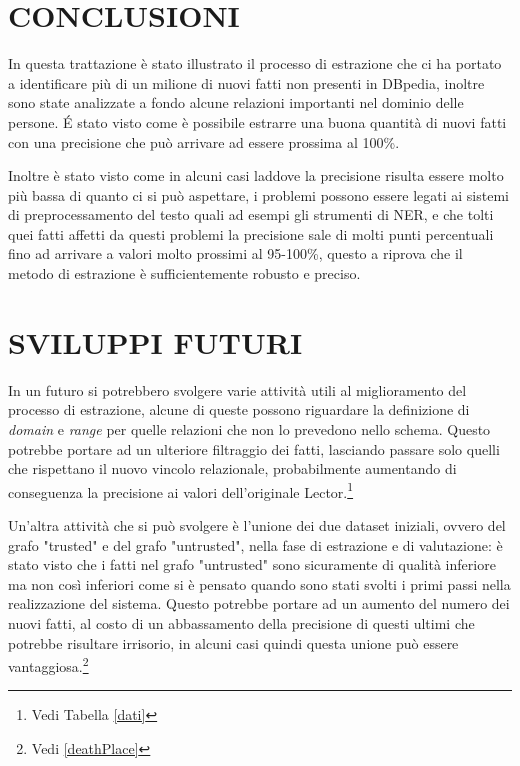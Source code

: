 \documentclass[10pt,a4paper,twocolumn]{article}
\begin{document}
\section{CONCLUSIONI}

In questa trattazione è stato illustrato il processo di estrazione che ci ha portato a identificare più di un milione di nuovi fatti non presenti in DBpedia, inoltre sono state analizzate a fondo alcune relazioni importanti nel dominio delle persone. \'E stato visto come è possibile estrarre una buona quantità di nuovi fatti con una precisione che può arrivare ad essere prossima al 100\%. 

Inoltre è stato visto come in alcuni casi laddove la precisione risulta essere molto più bassa di quanto ci si può aspettare, i problemi possono essere legati ai sistemi di preprocessamento del testo quali ad esempi gli strumenti di NER, e che tolti quei fatti affetti da questi problemi la precisione sale di molti punti percentuali fino ad arrivare a valori molto prossimi al 95-100\%, questo a riprova che il metodo di estrazione è sufficientemente robusto e preciso.

\section{SVILUPPI FUTURI}

In un futuro si potrebbero svolgere varie attività utili al miglioramento del processo di estrazione, alcune di queste possono riguardare la definizione di \textit{domain} e \textit{range} per quelle relazioni che non lo prevedono nello schema. Questo potrebbe portare ad un ulteriore filtraggio dei fatti, lasciando passare solo quelli che rispettano il nuovo vincolo relazionale, probabilmente aumentando di conseguenza la precisione ai valori dell'originale Lector.\footnote{Vedi Tabella \ref{dati}}

Un'altra attività che si può svolgere è l'unione dei due dataset iniziali, ovvero del grafo "trusted" e del grafo "untrusted", nella fase di estrazione e di valutazione: è stato visto che i fatti nel grafo "untrusted" sono sicuramente di qualità inferiore ma non così inferiori come si è pensato quando sono stati svolti i primi passi nella realizzazione del sistema. Questo potrebbe portare ad un aumento del numero dei nuovi fatti, al costo di un abbassamento della precisione di questi ultimi che potrebbe risultare irrisorio, in alcuni casi quindi questa unione può essere vantaggiosa.\footnote{Vedi \ref{deathPlace}}
\end{document}
